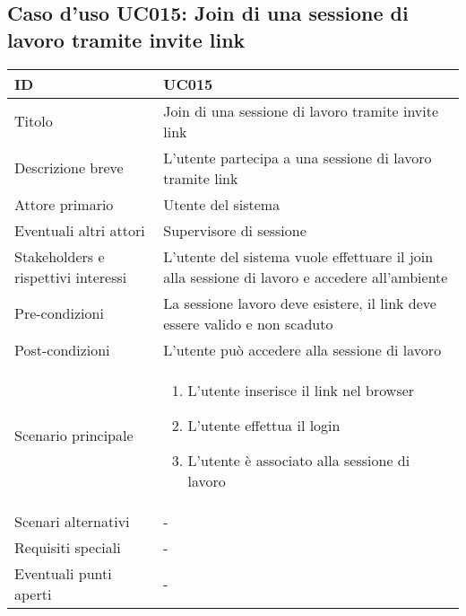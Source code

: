 \documentclass[../../main.tex]{subfiles}
\begin{document}
\subsection{Caso d’uso UC015: Join di una sessione di lavoro tramite invite link }
\begin{tabularx}{150mm}{|l|X|}
    \hline
    ID                                  & \textbf{UC015}\\
    \hline
    Titolo                              & Join di una sessione di lavoro tramite invite link \\
    \hline
    Descrizione breve                   & L'utente partecipa a una sessione di lavoro tramite link  \\
    \hline
    Attore primario                     & Utente del sistema   \\
    \hline
    Eventuali altri attori              & Supervisore di sessione   \\
    \hline
    Stakeholders e rispettivi interessi & L'utente del sistema vuole effettuare il join alla sessione di lavoro e accedere all'ambiente  \\
    \hline
    Pre-condizioni                      & La sessione lavoro deve esistere, il link deve essere valido e non scaduto  \\
    \hline
    Post-condizioni                     & L'utente può accedere alla sessione di lavoro   \\
    \hline
    Scenario principale                 &
    \begin{enumerate}
        \item L'utente inserisce il link nel browser
        \item L'utente effettua il login
        \item L'utente è associato alla sessione di lavoro 
    \end{enumerate} \\
            \hline
    Scenari alternativi                 & -   \\
    \hline
    Requisiti speciali                  & -   \\
    \hline
    Eventuali punti aperti              & -   \\
    \hline
\end{tabularx}
\newpage
\end{document}
